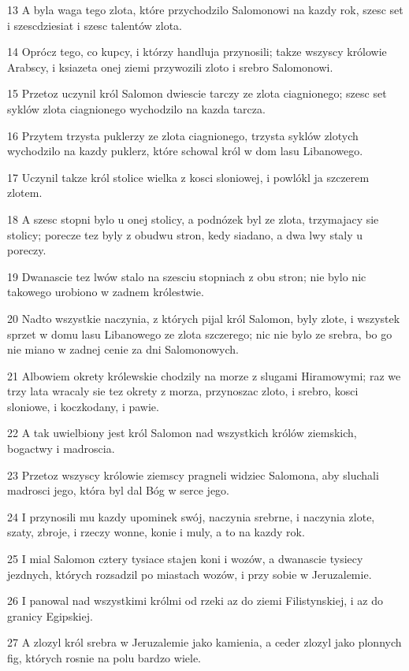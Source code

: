 \par 13 A byla waga tego zlota, które przychodzilo Salomonowi na kazdy rok, szesc set i szescdziesiat i szesc talentów zlota.
\par 14 Oprócz tego, co kupcy, i którzy handluja przynosili; takze wszyscy królowie Arabscy, i ksiazeta onej ziemi przywozili zloto i srebro Salomonowi.
\par 15 Przetoz uczynil król Salomon dwiescie tarczy ze zlota ciagnionego; szesc set syklów zlota ciagnionego wychodzilo na kazda tarcza.
\par 16 Przytem trzysta puklerzy ze zlota ciagnionego, trzysta syklów zlotych wychodzilo na kazdy puklerz, które schowal król w dom lasu Libanowego.
\par 17 Uczynil takze król stolice wielka z kosci sloniowej, i powlókl ja szczerem zlotem.
\par 18 A szesc stopni bylo u onej stolicy, a podnózek byl ze zlota, trzymajacy sie stolicy; porecze tez byly z obudwu stron, kedy siadano, a dwa lwy staly u poreczy.
\par 19 Dwanascie tez lwów stalo na szesciu stopniach z obu stron; nie bylo nic takowego urobiono w zadnem królestwie.
\par 20 Nadto wszystkie naczynia, z których pijal król Salomon, byly zlote, i wszystek sprzet w domu lasu Libanowego ze zlota szczerego; nic nie bylo ze srebra, bo go nie miano w zadnej cenie za dni Salomonowych.
\par 21 Albowiem okrety królewskie chodzily na morze z slugami Hiramowymi; raz we trzy lata wracaly sie tez okrety z morza, przynoszac zloto, i srebro, kosci sloniowe, i koczkodany, i pawie.
\par 22 A tak uwielbiony jest król Salomon nad wszystkich królów ziemskich, bogactwy i madroscia.
\par 23 Przetoz wszyscy królowie ziemscy pragneli widziec Salomona, aby sluchali madrosci jego, która byl dal Bóg w serce jego.
\par 24 I przynosili mu kazdy upominek swój, naczynia srebrne, i naczynia zlote, szaty, zbroje, i rzeczy wonne, konie i muly, a to na kazdy rok.
\par 25 I mial Salomon cztery tysiace stajen koni i wozów, a dwanascie tysiecy jezdnych, których rozsadzil po miastach wozów, i przy sobie w Jeruzalemie.
\par 26 I panowal nad wszystkimi królmi od rzeki az do ziemi Filistynskiej, i az do granicy Egipskiej.
\par 27 A zlozyl król srebra w Jeruzalemie jako kamienia, a ceder zlozyl jako plonnych fig, których rosnie na polu bardzo wiele.
